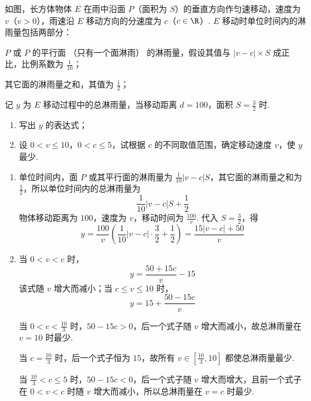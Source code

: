\begin{problem}
如图，长方体物体 \(E\) 在雨中沿面 \(P\)（面积为 \(S\)）的垂直方向作匀速移动，速度为 \(v\)（\(v > 0\)），雨速沿 \(E\) 移动方向的分速度为 \(c\)（\(c \in \R\)）. \(E\) 移动时单位时间内的淋雨量包括两部分：
\begin{circlelist}
\item \(P\) 或 \(P\) 的平行面 （只有一个面淋雨） 的淋雨量，假设其值与 \(|v - c| \times S\) 成正比，比例系数为 \(\frac{1}{10}\)；
\item 其它面的淋雨量之和，其值为 \(\frac{1}{2}\)；
\end{circlelist}
记 \(y\) 为 \(E\) 移动过程中的总淋雨量，当移动距离 \(d = 100\)，面积 \(S = \frac{3}{2}\) 时.
\begin{enumerate}
\item 写出 \(y\) 的表达式；
\item 设 \(0 < v \leqslant 10\)，\(0 < c \leqslant 5\)，试根据 \(c\) 的不同取值范围，确定移动速度 \(v\)，使 \(y\) 最少.
\end{enumerate}

\problemresetlayout
{}
\end{problem}

\begin{solution}
\begin{enumerate}
\item 单位时间内，面 \(P\) 或其平行面的淋雨量为 \(\frac{1}{10}|v-c|S\)，其它面的淋雨量之和为 \(\frac{1}{2}\)，所以单位时间内的总淋雨量为
\[
\frac{1}{10}|v-c|S+\frac{1}{2}
\]
物体移动距离为 \(100\)，速度为 \(v\)，移动时间为 \(\frac{100}{v}\). 代入 \(S=\frac{3}{2}\)，得
\[
y=\frac{100}{v}\left(\frac{1}{10}|v-c|\cdot\frac{3}{2}+\frac{1}{2}\right)=\frac{15|v-c|+50}{v}
\]

\item 当 \(0<v<c\) 时，
\[
y=\frac{50+15c}{v}-15
\]
该式随 \(v\) 增大而减小；当 \(c\leqslant v\leqslant 10\) 时，
\[
y=15+\frac{50-15c}{v}
\]

当 \(0<c<\frac{10}{3}\) 时，\(50-15c>0\)，后一个式子随 \(v\) 增大而减小，故总淋雨量在 \(v=10\) 时最少.

当 \(c=\frac{10}{3}\) 时，后一个式子恒为 \(15\)，故所有 \(v\in\left[\frac{10}{3},10\right]\) 都使总淋雨量最少.

当 \(\frac{10}{3}<c\leqslant 5\) 时，\(50-15c<0\)，后一个式子随 \(v\) 增大而增大，且前一个式子在 \(0<v<c\) 时随 \(v\) 增大而减小，所以总淋雨量在 \(v=c\) 时最少.
\end{enumerate}
\end{solution}

